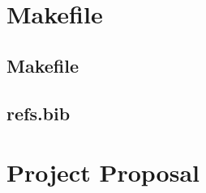 \documentclass[12pt,twoside,notitlepage]{report}
\begin{document}
\cleardoublepage

\chapter{Makefile}

\section{\label{makefile}Makefile}
{\scriptsize}

\section{refs.bib}
{\scriptsize}


\cleardoublepage

\chapter{Project Proposal}


\end{document}
